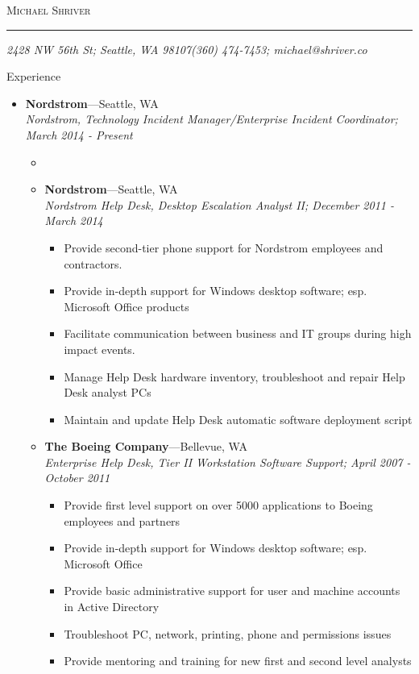 \documentclass[10pt,oneside]{article}
\makeatletter
\newcommand{\name}{Michael Shriver}
\newcommand{\addr}{2428 NW 56th St; Seattle, WA  98107}
\newcommand{\phone}{(360) 474-7453}
\newcommand{\email}{michael@shriver.co}
\newcommand{\bigname}[1]{
	\begin{flushleft}\fontfamily{ppl}\selectfont\Huge\scshape#1\end{flushleft}
}
\newenvironment{ressection}[1]{
	\vspace{4pt}
	{\fontfamily{ppl}\selectfont\Large#1}
	\begin{itemize}
	\vspace{3pt}
}{
	\end{itemize}
}
\newcommand{\ressubitem}[1]{
	\vspace{-1pt}
	\item \begin{flushleft} #1 \end{flushleft}
}
\newcommand{\resbigitem}[3]{
	\vspace{-5pt}
	\item
	\textbf{#1}---#2 \\
	\textit{#3}
}
\newenvironment{ressubsec}[3]{
	\resbigitem{#1}{#2}{#3}
	\vspace{-2pt}
	\begin{itemize}
}{
	\end{itemize}
}
\makeatother
\begin{document}
 \selectfont

\bigname{\name}

\vspace{-8pt} \rule{\textwidth}{1pt}

\vspace{-1pt} {\small\itshape \addr \hfill \phone; \email}

\vspace{8 pt}


\begin{ressection}{Experience}

	\begin{ressubsec}{Nordstrom}{Seattle, WA}{Nordstrom, Technology Incident Manager/Enterprise Incident Coordinator; March 2014 - Present}
		\ressubitem{}

	\begin{ressubsec}{Nordstrom}{Seattle, WA}{Nordstrom Help Desk, Desktop Escalation Analyst II; December 2011 - March 2014}
		\ressubitem{Provide second-tier phone support for Nordstrom employees and contractors.}
		\ressubitem{Provide in-depth support for Windows desktop software; esp. Microsoft Office products}
		\ressubitem{Facilitate communication between business and IT groups during high impact events.}
		\ressubitem{Manage Help Desk hardware inventory, troubleshoot and repair Help Desk analyst PCs}
		\ressubitem{Maintain and update Help Desk automatic software deployment script}
	\end{ressubsec}

	\begin{ressubsec}{The Boeing Company}{Bellevue, WA}{Enterprise Help Desk, Tier II Workstation Software Support; April 2007 - October 2011}
		\ressubitem{Provide first level support on over 5000 applications to Boeing employees and partners}
		\ressubitem{Provide in-depth support for Windows desktop software; esp. Microsoft Office}
		\ressubitem{Provide basic administrative support for user and machine accounts in Active Directory}
		\ressubitem{Troubleshoot PC, network, printing, phone and permissions issues}
		\ressubitem{Provide mentoring and training for new first and second level analysts}
	\end{ressubsec}



\end{ressubsec}
\end{ressection}
\end{document}
